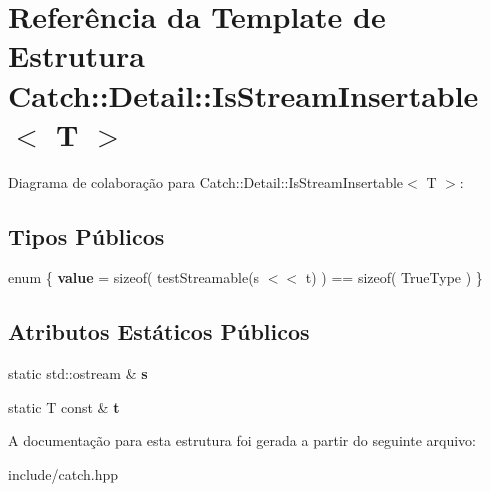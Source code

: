 \hypertarget{structCatch_1_1Detail_1_1IsStreamInsertable}{}\section{Referência da Template de Estrutura Catch\+:\+:Detail\+:\+:Is\+Stream\+Insertable$<$ T $>$}
\label{structCatch_1_1Detail_1_1IsStreamInsertable}


Diagrama de colaboração para Catch\+:\+:Detail\+:\+:Is\+Stream\+Insertable$<$ T $>$\+:
\subsection*{Tipos Públicos}
\begin{DoxyCompactItemize}
\item 
enum \{ {\bfseries value} = sizeof( test\+Streamable(s $<$$<$ t) ) == sizeof( True\+Type )
 \}\hypertarget{structCatch_1_1Detail_1_1IsStreamInsertable_a2e4508694da3bf368ff67733a7970edd}{}\label{structCatch_1_1Detail_1_1IsStreamInsertable_a2e4508694da3bf368ff67733a7970edd}

\end{DoxyCompactItemize}
\subsection*{Atributos Estáticos Públicos}
\begin{DoxyCompactItemize}
\item 
static std\+::ostream \& {\bfseries s}\hypertarget{structCatch_1_1Detail_1_1IsStreamInsertable_abe3d3c8e5d85665747faafffc9a96b00}{}\label{structCatch_1_1Detail_1_1IsStreamInsertable_abe3d3c8e5d85665747faafffc9a96b00}

\item 
static T const \& {\bfseries t}\hypertarget{structCatch_1_1Detail_1_1IsStreamInsertable_a7d2a3da978b6736667a7b2f6d51f507f}{}\label{structCatch_1_1Detail_1_1IsStreamInsertable_a7d2a3da978b6736667a7b2f6d51f507f}

\end{DoxyCompactItemize}


A documentação para esta estrutura foi gerada a partir do seguinte arquivo\+:\begin{DoxyCompactItemize}
\item 
include/catch.\+hpp\end{DoxyCompactItemize}
